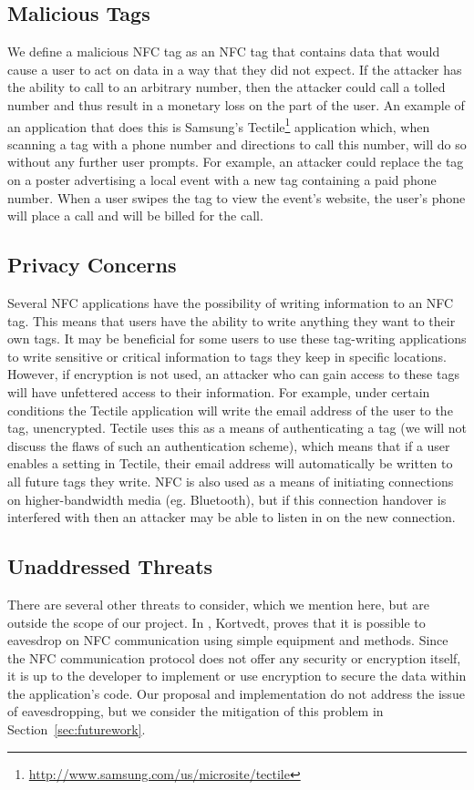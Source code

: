 \documentclass[12pt]{article}
\begin{document}
\subsection{Malicious Tags}
We define a malicious NFC tag as an NFC tag that contains data that would cause a user to act on data in a way that they did not expect.
If the attacker has the ability to call to an arbitrary number, then the attacker could call a tolled number and thus result in a monetary loss on the part of the user. 
An example of an application that does this is Samsung's Tectile\footnote{\url{http://www.samsung.com/us/microsite/tectile}} application which, when scanning a tag with a phone number and directions to call this number, will do so without any further user prompts.
For example, an attacker could replace the tag on a poster advertising a local event with a new tag containing a paid phone number.
When a user swipes the tag to view the event's website, the user's phone will place a call and will be billed for the call.

\subsection{Privacy Concerns}
\label{sec:threatmodel:privacy}
Several NFC applications have the possibility of writing information to an NFC tag.
This means that users have the ability to write anything they want to their own tags.
It may be beneficial for some users to use these tag-writing applications to write sensitive or critical information to tags they keep in specific locations.
However, if encryption is not used, an attacker who can gain access to these tags will have unfettered access to their information.
For example, under certain conditions the Tectile application will write the email address of the user to the tag, unencrypted.
Tectile uses this as a means of authenticating a tag (we will not discuss the flaws of such an authentication scheme), which means that if a user enables a setting in Tectile, their email address will automatically be written to all future tags they write.
NFC is also used as a means of initiating connections on higher-bandwidth media (eg. Bluetooth), but if this connection handover is interfered with then an attacker may be able to listen in on the new connection.

\subsection{Unaddressed Threats}
There are several other threats to consider, which we mention here, but are outside the scope of our project.
In \cite{kortvedt2009}, Kortvedt, proves that it is possible to eavesdrop on NFC communication using simple equipment and methods.
Since the NFC communication protocol does not offer any security or encryption itself, it is up to the developer to implement or use encryption to secure the data within the application's code. 
Our proposal and implementation do not address the issue of eavesdropping, but we consider the mitigation of this problem in Section~\ref{sec:futurework}.
\end{document}
